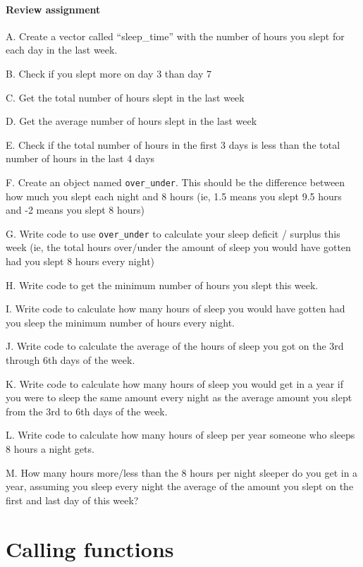 \documentclass[
]{book}
\begin{document}
\hypertarget{review-assignment-3}{%
\subsubsection*{Review assignment}\label{review-assignment-3}}

A. Create a vector called ``sleep\_time'' with the number of hours you slept for each day in the last week.

B. Check if you slept more on day 3 than day 7

C. Get the total number of hours slept in the last week

D. Get the average number of hours slept in the last week

E. Check if the total number of hours in the first 3 days is less than the total number of hours in the last 4 days

F. Create an object named \texttt{over\_under}. This should be the difference between how much you slept each night and 8 hours (ie, 1.5 means you slept 9.5 hours and -2 means you slept 8 hours)

G. Write code to use \texttt{over\_under} to calculate your sleep deficit / surplus this week (ie, the total hours over/under the amount of sleep you would have gotten had you slept 8 hours every night)

H. Write code to get the minimum number of hours you slept this week.

I. Write code to calculate how many hours of sleep you would have gotten had you sleep the minimum number of hours every night.

J. Write code to calculate the average of the hours of sleep you got on the 3rd through 6th days of the week.

K. Write code to calculate how many hours of sleep you would get in a year if you were to sleep the same amount every night as the average amount you slept from the 3rd to 6th days of the week.

L. Write code to calculate how many hours of sleep per year someone who sleeps 8 hours a night gets.

M. How many hours more/less than the 8 hours per night sleeper do you get in a year, assuming you sleep every night the average of the amount you slept on the first and last day of this week?

\hypertarget{calling_functions}{%
\chapter{Calling functions}\label{calling_functions}}
\end{document}
